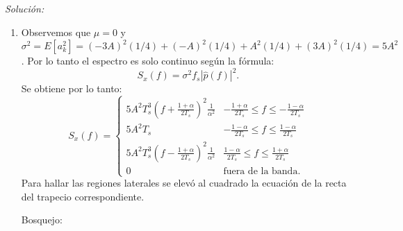 \documentclass[a4paper,11pt]{article}
\newenvironment{solucion}[1][]{
\noindent \large \textsl{Solución:} \ifthenelse{\equal{#1}{}}{}{\emph{(#1)}}

\smallskip
}{
\bigskip
}
\begin{document}
\begin{solucion}
\begin{enumerate}
        \item Observemos que $\mu=0$ y $\sigma^2 = E[a_k^2] = (-3A)^2(1/4) + (-A)^2(1/4) + A^2 (1/4) + (3A)^2 (1/4) = 5A^2$. Por lo tanto el espectro es solo continuo según la fórmula:
         \begin{equation*}
                S_x(f) = \sigma^2 f_s |\hat{p}(f)|^2.
         \end{equation*}
         Se obtiene por lo tanto:
         \begin{equation*}
                S_x(f) = \begin{cases}
                5A^2 T_s^3 \left(f+\frac{1+\alpha}{2T_s}\right)^2 \frac{1}{\alpha^2} & -\frac{1+\alpha}{2T_s} \leqslant f \leqslant -\frac{1-\alpha}{2T_s} \\
                5A^2 T_s & -\frac{1-\alpha}{2T_s} \leqslant f \leqslant \frac{1-\alpha}{2T_s} \\
                5A^2 T_s^3 \left(f-\frac{1+\alpha}{2T_s}\right)^2 \frac{1}{\alpha^2}& \frac{1-\alpha}{2T_s} \leqslant f \leqslant \frac{1+\alpha}{2T_s} \\
                0 & \textrm{fuera de la banda}.
                \end{cases}
         \end{equation*}
         Para hallar las regiones laterales se elevó al cuadrado la ecuación de la recta del trapecio correspondiente.

         Bosquejo:
         \begin{center}
        \end{center}


\end{enumerate}
\end{solucion}
\end{document}
